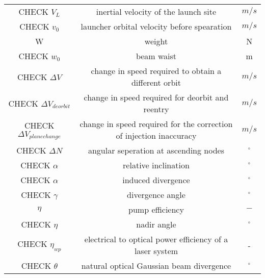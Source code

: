 \begin{center}
\begin{longtable}{c|c|c}
CHECK $V_L$                               & inertial velocity of the launch site        & $m/s$ \\

CHECK $v_0$                               & launcher orbital velocity before spearation & $m/s$ \\

W 																	& weight 																			& N \\

CHECK $w_0$                       & beam waist                                      & m \\

CHECK $\Delta V$                           & change in speed required to obtain a different orbit & $m/s$ \\

CHECK $\Delta V_{deorbit}$                      & change in speed required for deorbit and reentry         & $m/s$ \\ 

CHECK $\Delta V_{planechange}$                      & change in speed required for the correction of injection inaccuracy         & $m/s$ \\ 

CHECK $\Delta N$                               & angular seperation at ascending nodes            & $^\circ$ \\    

CHECK $\alpha$                            & relative inclination                        & $^\circ$ \\

CHECK $\alpha$                            & induced divergence                       & $^\circ$ \\

CHECK $\gamma$                             & divergence angle                         & $^\circ$ \\  

$\eta$ 															& pump efficiency 														& $-$ \\

CHECK $\eta$ 															& nadir angle														& $^\circ$ \\

CHECK $\eta_{wp}$                       & electrical to optical power efficiency of a laser system  & - \\

CHECK $\theta$                             & natural optical Gaussian beam divergence       & $^\circ$ \\


\end{longtable}
\end{center}
